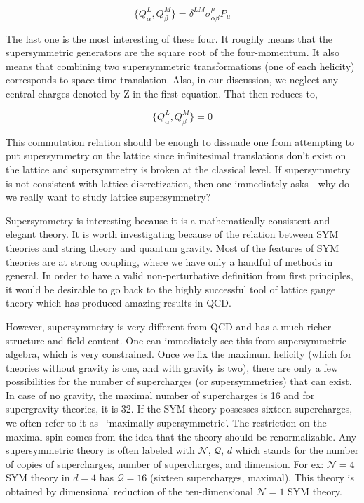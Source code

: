\[ \{Q_{\alpha}^{L}, \bar{Q_{\beta}^{M}}\} = \delta^{LM} \sigma^{\mu}_{\alpha\beta} P_{\mu} \] 

The last one is the most interesting of these four. It roughly means that the supersymmetric generators are
 the square root of the four-momentum. It also means that combining two supersymmetric transformations 
 (one of each helicity) corresponds to space-time translation. Also, in our discussion, we neglect any central 
 charges denoted by Z in the first equation. That then reduces to,  

\[ \{Q_{\alpha}^{L}, Q_{\beta}^{M}\} = 0 \]  

This commutation relation should be enough to dissuade one from attempting to put supersymmetry on the lattice since 
infinitesimal translations don't exist on the lattice and supersymmetry is broken at the classical level. If supersymmetry is 
not consistent with lattice discretization, then one immediately asks - why do we really want to study lattice supersymmetry? 

Supersymmetry is interesting because it is a mathematically consistent and elegant theory. It is worth investigating because
of the relation between SYM theories and string theory and quantum gravity. 
Most of the features of SYM theories are at strong coupling, where we have only a handful of methods in general. 
In order to have a valid non-perturbative definition from first principles, it would be desirable to go back to the highly 
successful tool of lattice gauge theory which has produced amazing results in QCD. 

However, supersymmetry is very different from QCD and has a much richer structure and field content. 
One can immediately see this from supersymmetric algebra, which is very constrained. 
Once we fix the maximum helicity (which for theories without gravity is one, and with gravity is two), 
there are only a few possibilities for the number of supercharges (or supersymmetries) that can exist. In case of no gravity, 
the maximal number of supercharges is 
16 and for supergravity theories, it is 32. If the SYM theory possesses sixteen supercharges, 
we often refer to it as ~`maximally supersymmetric'.
The restriction on the maximal spin comes from the idea that the theory should be renormalizable.
Any supersymmetric theory is often labeled with $\mathcal{N}$, $\mathcal{Q}$, $d$  which stands for the 
number of copies of supercharges, number of supercharges, and dimension. 
For ex: $\mathcal{N}=4$ SYM theory in $d=4$ has $\mathcal{Q}=16$ (sixteen supercharges, maximal).
This theory is obtained by dimensional reduction of the ten-dimensional $\mathcal{N}=1$ SYM theory. 


